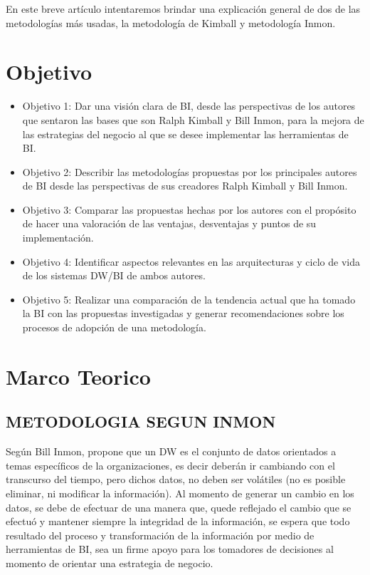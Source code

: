 \documentclass[preprint,12pt]{elsarticle}
\begin{document}
En este breve artículo intentaremos brindar una explicación general de dos de las metodologías más usadas, la metodología de Kimball y metodología Inmon.

\section{Objetivo}
		\begin{itemize}
		\item Objetivo 1: Dar una visión clara de BI, desde las perspectivas de los autores que sentaron las bases que son Ralph Kimball y Bill Inmon, para la mejora de las estrategias del negocio al que se desee implementar las herramientas de BI.
		\item Objetivo 2: Describir las metodologías propuestas por los principales autores de BI desde las perspectivas de sus creadores Ralph Kimball y Bill Inmon.
		\item Objetivo 3: Comparar las propuestas hechas por los autores con el propósito de hacer una valoración de las ventajas, desventajas y puntos de su implementación.
		\item Objetivo 4: Identificar aspectos relevantes en las arquitecturas y ciclo de vida de los sistemas DW/BI de ambos autores.
		\item Objetivo 5: Realizar una comparación de la tendencia actual que ha tomado la BI con las propuestas investigadas y generar recomendaciones sobre los procesos de adopción de una metodología. 


	\end{itemize}

\section{Marco Teorico}
	
\subsection{METODOLOGIA SEGUN INMON}	

	Según Bill Inmon, propone que un DW es el conjunto de datos orientados a temas específicos de la organizaciones, es decir deberán ir cambiando con el transcurso del tiempo, pero dichos datos, no deben ser volátiles (no es posible eliminar, ni modificar la información).
Al momento de generar un cambio en los datos, se debe de efectuar de una manera que, quede reflejado el cambio que se efectuó y mantener siempre la integridad de la información, se espera que todo resultado del proceso y transformación de la información por medio de herramientas de BI, sea un firme apoyo para los tomadores de decisiones al momento de orientar una estrategia de negocio.
\end{document}
